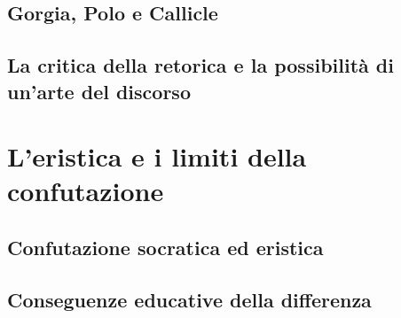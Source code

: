 \subsection{Gorgia, Polo e Callicle}

\subsection{La critica della retorica e la possibilità di un'arte del discorso}

\section{L'eristica e i limiti della confutazione}

\subsection{Confutazione socratica ed eristica}

\subsection{Conseguenze educative della differenza}
